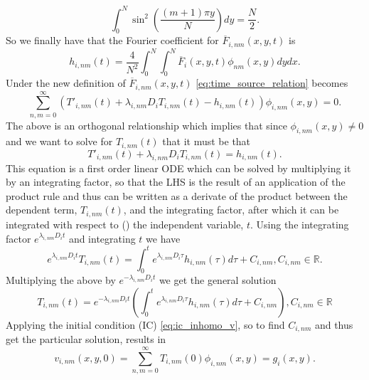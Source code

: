 \documentclass[\main/thesis.tex]{subfiles}
\begin{document}
\begin{equation*}
\int_{0}^{N} \sin^2\left( \frac{(m+1)\pi y}{N} \right) dy {=} \frac{N}{2}.
\end{equation*}
So we finally have that the Fourier coefficient for $\overline{F}_{i,nm}(x, y, t)$ is 
\begin{equation}
h_{i,nm}(t) {=} \frac{4}{N^2} \int_{0}^{N} \int_{0}^{N} \overline{F}_i(x, y, t) \phi_{nm}(x, y) dy dx.
\label{eq:fourier_coeff_F}
\end{equation} 
Under the new definition of $\overline{F}_{i, nm}(x, y, t)$ \eqref{eq:time_source_relation} becomes
\begin{equation*}
\sum_{n,m{=}0}^{\infty} \left( T'_{i,nm}(t) {+} \lambda_{i,nm} D_i T_{i,nm}(t) {-} h_{i,nm}(t) \right) \phi_{i,nm}(x, y) {=} 0.
\end{equation*}
The above is an orthogonal relationship which implies that since $\phi_{i,nm}(x, y) {\ne} 0$ and we want to solve for $T_{i,nm}(t)$ that it must be that
\begin{equation*}
T'_{i,nm}(t) {+} \lambda_{i,nm} D_i T_{i,nm}(t) {=} h_{i,nm}(t).
\end{equation*}
This equation is a first order linear ODE which can be solved by multiplying it by an integrating factor, so that the LHS is the result of an application of the product rule and thus can be written as a derivate of the product between the dependent term, $T_{i,nm}(t)$, and the integrating factor, after which it can be integrated with respect to (\wrt) the independent variable, $t$. Using the integrating factor $e^{\lambda_{i, nm} D_i t}$ and integrating \wrt $t$ we have  
\begin{equation*}
e^{\lambda_{i,nm} D_i t} T_{i,nm}(t) {=} \int_{0}^{t} e^{\lambda_{i,nm} D_i \tau} h_{i,nm}(\tau) d\tau {+} C_{i,nm}, C_{i,nm} {\in} \mathbb{R}.
\end{equation*}
Multiplying the above by $e^{\minus\lambda_{i,nm} D_i t}$ we get the general solution
\begin{equation}
T_{i,nm}(t) {=} e^{\minus\lambda_{i,nm} D_i t} \left( \int_{0}^{t} e^{\lambda_{i,nm} D_i \tau} h_{i,nm}(\tau) d\tau {+} C_{i,nm} \right), C_{i,nm} {\in} \mathbb{R}
\label{eq:time_depen_sol}
\end{equation}
Applying the initial condition (IC) \eqref{eq:ic_inhomo_v}, so to find $C_{i,nm}$ and thus get the particular solution, results in
\begin{equation*}
v_{i, nm}(x, y, 0) {=} \sum_{n,m{=}0}^{\infty} T_{i,nm}(0)\phi_{i,nm}(x, y) {=} g_i(x, y).
\end{equation*}
\end{document}
